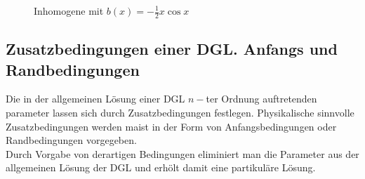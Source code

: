 \begin{enumerate}
\begin{figure}[ht]
\begin{minipage}[b]{0.45\linewidth}
\end{minipage}
\hspace{0.5cm}
\begin{minipage}[b]{0.45\linewidth}

\begin{center}
\end{center}
Inhomogene mit $b(x)=-\frac{1}{2}x\cos x$
\end{minipage}
\end{figure}










\subsection*{Zusatzbedingungen einer DGL. Anfangs und Randbedingungen}
Die in der allgemeinen Lösung einer DGL $n-$ter Ordnung auftretenden parameter lassen sich durch Zusatzbedingungen festlegen. Physikalische sinnvolle Zusatzbedingungen werden maist in der Form von Anfangsbedingungen oder Randbedingungen vorgegeben. \\

Durch Vorgabe von derartigen Bedingungen eliminiert man die Parameter aus der allgemeinen Lösung der DGL und erhölt damit eine partikuläre Lösung.

\end{enumerate}
